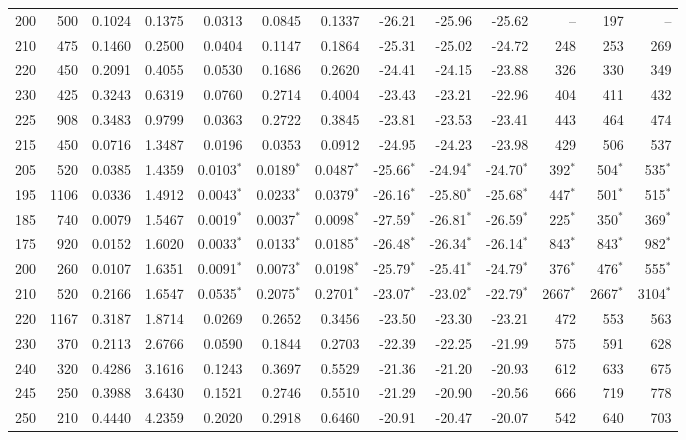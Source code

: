 {\begin{landscape}
\begin{longtable}{r r r r r r r r r r r r r}
200 & 500 & 0.1024 & 0.1375 & 0.0313 & 0.0845 & 0.1337 & -26.21 & -25.96 & -25.62 & -- & 197 & -- \\
210 & 475 & 0.1460 & 0.2500 & 0.0404 & 0.1147 & 0.1864 & -25.31 & -25.02 & -24.72 & 248 & 253 & 269 \\
220 & 450 & 0.2091 & 0.4055 & 0.0530 & 0.1686 & 0.2620 & -24.41 & -24.15 & -23.88 & 326 & 330 & 349 \\
230 & 425 & 0.3243 & 0.6319 & 0.0760 & 0.2714 & 0.4004 & -23.43 & -23.21 & -22.96 & 404 & 411 & 432 \\
225 & 908 & 0.3483 & 0.9799 & 0.0363 & 0.2722 & 0.3845 & -23.81 & -23.53 & -23.41 & 443 & 464 & 474 \\
215 & 450 & 0.0716 & 1.3487 & 0.0196 & 0.0353 & 0.0912 & -24.95 & -24.23 & -23.98 & 429 & 506 & 537 \\
205 & 520 & 0.0385 & 1.4359 & 0.0103$^*$ & 0.0189$^*$ & 0.0487$^*$ & -25.66$^*$ & -24.94$^*$ & -24.70$^*$ & 392$^*$ & 504$^*$ & 535$^*$ \\
195 & 1106 & 0.0336 & 1.4912 & 0.0043$^*$ & 0.0233$^*$ & 0.0379$^*$ & -26.16$^*$ & -25.80$^*$ & -25.68$^*$ & 447$^*$ & 501$^*$ & 515$^*$ \\
185 & 740 & 0.0079 & 1.5467 & 0.0019$^*$ & 0.0037$^*$ & 0.0098$^*$ & -27.59$^*$ & -26.81$^*$ & -26.59$^*$ & 225$^*$ & 350$^*$ & 369$^*$ \\
175 & 920 & 0.0152 & 1.6020 & 0.0033$^*$ & 0.0133$^*$ & 0.0185$^*$ & -26.48$^*$ & -26.34$^*$ & -26.14$^*$ & 843$^*$ & 843$^*$ & 982$^*$ \\
200 & 260 & 0.0107 & 1.6351 & 0.0091$^*$ & 0.0073$^*$ & 0.0198$^*$ & -25.79$^*$ & -25.41$^*$ & -24.79$^*$ & 376$^*$ & 476$^*$ & 555$^*$ \\
210 & 520 & 0.2166 & 1.6547 & 0.0535$^*$ & 0.2075$^*$ & 0.2701$^*$ & -23.07$^*$ & -23.02$^*$ & -22.79$^*$ & 2667$^*$ & 2667$^*$ & 3104$^*$ \\
220 & 1167 & 0.3187 & 1.8714 & 0.0269 & 0.2652 & 0.3456 & -23.50 & -23.30 & -23.21 & 472 & 553 & 563 \\
230 & 370 & 0.2113 & 2.6766 & 0.0590 & 0.1844 & 0.2703 & -22.39 & -22.25 & -21.99 & 575 & 591 & 628 \\
240 & 320 & 0.4286 & 3.1616 & 0.1243 & 0.3697 & 0.5529 & -21.36 & -21.20 & -20.93 & 612 & 633 & 675 \\
245 & 250 & 0.3988 & 3.6430 & 0.1521 & 0.2746 & 0.5510 & -21.29 & -20.90 & -20.56 & 666 & 719 & 778 \\
250 & 210 & 0.4440 & 4.2359 & 0.2020 & 0.2918 & 0.6460 & -20.91 & -20.47 & -20.07 & 542 & 640 & 703 \\

\end{longtable}
\end{landscape}}
